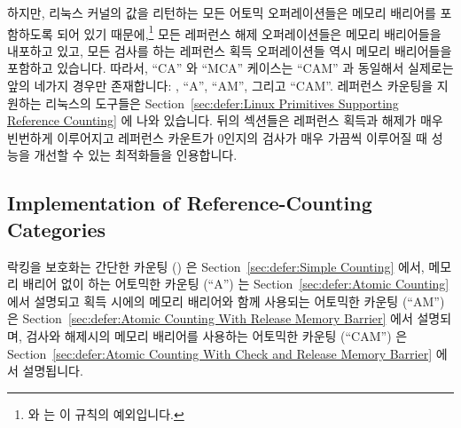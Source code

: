 하지만, 리눅스 커널의 값을 리턴하는 모든 어토믹 오퍼레이션들은 메모리 배리어를
포함하도록 되어 있기 때문에,\footnote{
	 와  는 이 규칙의 예외입니다.}
모든 레퍼런스 해제 오퍼레이션들은 메모리 배리어들을 내포하고 있고, 모든 검사를
하는 레퍼런스 획득 오퍼레이션들 역시 메모리 배리어들을 포함하고 있습니다.
따라서, ``CA'' 와 ``MCA'' 케이스는 ``CAM'' 과 동일해서 실제로는 앞의 네가지
경우만 존재합니다:
, ``A'', ``AM'', 그리고 ``CAM''.
레퍼런스 카운팅을 지원하는 리눅스의 도구들은
Section~\ref{sec:defer:Linux Primitives Supporting Reference Counting} 에 나와
있습니다.
뒤의 섹션들은 레퍼런스 획득과 해제가 매우 빈번하게 이루어지고 레퍼런스 카운트가
0인지의 검사가 매우 가끔씩 이루어질 때 성능을 개선할 수 있는 최적화들을
인용합니다.

\subsection{Implementation of Reference-Counting Categories}
\label{sec:defer:Implementation of Reference-Counting Categories}

락킹을 보호화는 간단한 카운팅 () 은
Section~\ref{sec:defer:Simple Counting} 에서,
메모리 배리어 없이 하는 어토믹한 카운팅 (``A'') 는
Section~\ref{sec:defer:Atomic Counting} 에서 설명되고
획득 시에의 메모리 배리어와 함께 사용되는 어토믹한 카운팅 (``AM'') 은
Section~\ref{sec:defer:Atomic Counting With Release Memory Barrier} 에서
설명되며, 검사와 해제시의 메모리 배리어를 사용하는 어토믹한 카운팅 (``CAM'') 은
Section~\ref{sec:defer:Atomic Counting With Check and Release Memory Barrier}
에서 설명됩니다.
\iffalse

